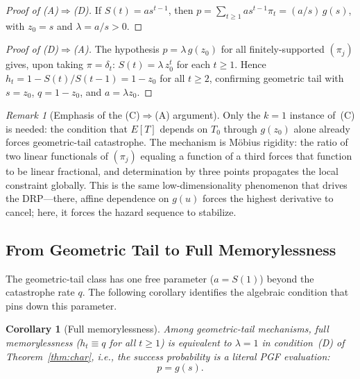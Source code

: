 \documentclass[11pt]{article}
\theoremstyle{plain}
\newtheorem{corollary}[theorem]{Corollary}
\theoremstyle{definition}
\theoremstyle{remark}
\newtheorem{remark}[theorem]{Remark}
\begin{document}
\begin{proof}[Proof of {\rm (A)$\Rightarrow$(D)}]
If $S(t) = as^{t-1}$, then $p = \sum_{t \geq 1}as^{t-1}\pi_t = (a/s)\,g(s)$, with $z_0 = s$ and $\lambda = a/s > 0$.
\end{proof}

\begin{proof}[Proof of {\rm (D)$\Rightarrow$(A)}]
The hypothesis $p = \lambda\,g(z_0)$ for all finitely-supported $(\pi_j)$ gives, upon taking $\pi = \delta_t$: $S(t) = \lambda\,z_0^t$ for each $t \geq 1$.  Hence $h_t = 1 - S(t)/S(t-1) = 1 - z_0$ for all $t \geq 2$, confirming geometric tail with $s = z_0$, $q = 1-z_0$, and $a = \lambda z_0$.
\end{proof}



\begin{remark}[Emphasis of the (C)$\Rightarrow$(A) argument]\label{rem:mobius}
Only the $k=1$ instance of~(C) is needed: the condition that $E[T]$ depends on $T_0$ through $g(z_0)$ alone already forces geometric-tail catastrophe.  The mechanism is M\"obius rigidity: the ratio of two linear functionals of $(\pi_j)$ equaling a function of a third forces that function to be linear fractional, and determination by three points propagates the local constraint globally.  This is the same low-dimensionality phenomenon that drives the DRP---there, affine dependence on $g(u)$ forces the highest derivative to cancel; here, it forces the hazard sequence to stabilize.
\end{remark}





\subsection{From Geometric Tail to Full Memorylessness}\label{sec:full-memoryless}

The geometric-tail class has one free parameter ($a = S(1)$) beyond the catastrophe rate $q$.  The following corollary identifies the algebraic condition that pins down this parameter.

\begin{corollary}[Full memorylessness]\label{cor:full-memoryless}
Among geometric-tail mechanisms, full memorylessness ($h_t \equiv q$ for all $t \geq 1$) is equivalent to $\lambda = 1$ in condition~(D) of Theorem~\ref{thm:char}, i.e., the success probability is a literal PGF evaluation:
\[
  p = g(s).
\]
\end{corollary}
\end{document}
